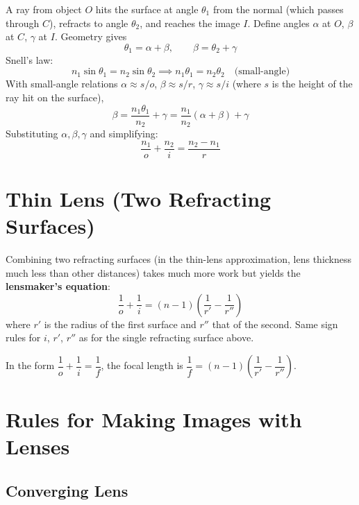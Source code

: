 \documentclass[11pt]{report}
\begin{document}
A ray from object $O$ hits the surface at angle $\theta_1$ from the normal (which passes through $C$), refracts to angle $\theta_2$, and reaches the image $I$. Define angles $\alpha$ at $O$, $\beta$ at $C$, $\gamma$ at $I$. Geometry gives
\begin{equation}
\theta_1 = \alpha + \beta, \qquad \beta = \theta_2 + \gamma
\end{equation}
Snell's law:
\begin{equation}
n_1 \sin\theta_1 = n_2 \sin\theta_2 \implies n_1 \theta_1 = n_2 \theta_2 \quad \text{(small-angle)}
\end{equation}
With small-angle relations $\alpha \approx s/o$, $\beta \approx s/r$, $\gamma \approx s/i$ (where $s$ is the height of the ray hit on the surface),
\begin{equation}
\beta = \frac{n_1\theta_1}{n_2} + \gamma = \frac{n_1}{n_2}(\alpha + \beta) + \gamma
\end{equation}
Substituting $\alpha, \beta, \gamma$ and simplifying:
\begin{equation}
\boxed{\frac{n_1}{o} + \frac{n_2}{i} = \frac{n_2 - n_1}{r}}
\end{equation}

\section{Thin Lens (Two Refracting Surfaces)}

Combining two refracting surfaces (in the thin-lens approximation, lens thickness much less than other distances) takes much more work but yields the \textbf{lensmaker's equation}:
\begin{equation}
\boxed{\frac{1}{o} + \frac{1}{i} = (n - 1)\left(\frac{1}{r'} - \frac{1}{r''}\right)}
\end{equation}
where $r'$ is the radius of the first surface and $r''$ that of the second. Same sign rules for $i$, $r'$, $r''$ as for the single refracting surface above.

In the form $\dfrac{1}{o} + \dfrac{1}{i} = \dfrac{1}{f}$, the focal length is $\dfrac{1}{f} = (n-1)\!\left(\dfrac{1}{r'} - \dfrac{1}{r''}\right)$.

\section{Rules for Making Images with Lenses}

\subsection*{Converging Lens}
\end{document}

